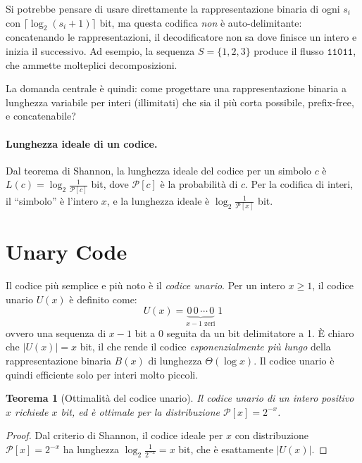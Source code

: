 \documentclass[12pt, a4paper, oneside]{book}
\theoremstyle{plain}
\newtheorem{teorema}{Teorema}[chapter]
\theoremstyle{definition}
\theoremstyle{remark}
\begin{document}
Si potrebbe pensare di usare direttamente la rappresentazione binaria di ogni $s_i$ con $\lceil \log_2(s_i + 1) \rceil$ bit, ma questa codifica \emph{non} è auto-delimitante: concatenando le rappresentazioni, il decodificatore non sa dove finisce un intero e inizia il successivo. Ad esempio, la sequenza $S = \{1, 2, 3\}$ produce il flusso $\mathtt{11011}$, che ammette molteplici decomposizioni.

La domanda centrale è quindi: come progettare una rappresentazione binaria a lunghezza variabile per interi (illimitati) che sia il più corta possibile, prefix-free, e concatenabile?

\paragraph{Lunghezza ideale di un codice.}
Dal teorema di Shannon, la lunghezza ideale del codice per un simbolo $c$ è $L(c) = \log_2 \frac{1}{\mathcal{P}[c]}$ bit, dove $\mathcal{P}[c]$ è la probabilità di $c$. Per la codifica di interi, il ``simbolo'' è l'intero $x$, e la lunghezza ideale è $\log_2 \frac{1}{\mathcal{P}[x]}$ bit.

\section{Unary Code}
\label{sec:unary-code}

Il codice più semplice e più noto è il \emph{codice unario}. Per un intero $x \geq 1$, il codice unario $U(x)$ è definito come:
\[
U(x) = \underbrace{0\,0\,\cdots\,0}_{x-1 \text{ zeri}}\;1
\]
ovvero una sequenza di $x - 1$ bit a 0 seguita da un bit delimitatore a 1. È chiaro che $|U(x)| = x$ bit, il che rende il codice \emph{esponenzialmente più lungo} della rappresentazione binaria $B(x)$ di lunghezza $\Theta(\log x)$. Il codice unario è quindi efficiente solo per interi molto piccoli.

\begin{teorema}[Ottimalità del codice unario]
\label{thm:unary-optimal}
Il codice unario di un intero positivo $x$ richiede $x$ bit, ed è ottimale per la distribuzione $\mathcal{P}[x] = 2^{-x}$.
\end{teorema}

\begin{proof}
Dal criterio di Shannon, il codice ideale per $x$ con distribuzione $\mathcal{P}[x] = 2^{-x}$ ha lunghezza $\log_2 \frac{1}{2^{-x}} = x$ bit, che è esattamente $|U(x)|$.
\end{proof}
\end{document}
